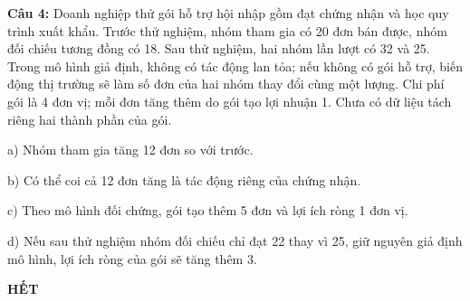 \documentclass[12pt,a4paper]{article}
\begin{document}
\par\noindent\begin{minipage}{\linewidth}
\noindent\textbf{Câu 4:} Doanh nghiệp thử gói hỗ trợ hội nhập gồm đạt chứng nhận và học quy trình xuất khẩu. Trước thử nghiệm, nhóm tham gia có 20 đơn bán được, nhóm đối chiếu tương đồng có 18. Sau thử nghiệm, hai nhóm lần lượt có 32 và 25. Trong mô hình giả định, không có tác động lan tỏa; nếu không có gói hỗ trợ, biến động thị trường sẽ làm số đơn của hai nhóm thay đổi cùng một lượng. Chi phí gói là 4 đơn vị; mỗi đơn tăng thêm do gói tạo lợi nhuận 1. Chưa có dữ liệu tách riêng hai thành phần của gói.\par
\noindent a) Nhóm tham gia tăng 12 đơn so với trước.\par
\noindent b) Có thể coi cả 12 đơn tăng là tác động riêng của chứng nhận.\par
\noindent c) Theo mô hình đối chứng, gói tạo thêm 5 đơn và lợi ích ròng 1 đơn vị.\par
\noindent d) Nếu sau thử nghiệm nhóm đối chiếu chỉ đạt 22 thay vì 25, giữ nguyên giả định mô hình, lợi ích ròng của gói sẽ tăng thêm 3.\par
\end{minipage}\par\vspace{0.12cm}
\begin{center}\textbf{HẾT}\end{center}
\end{document}
